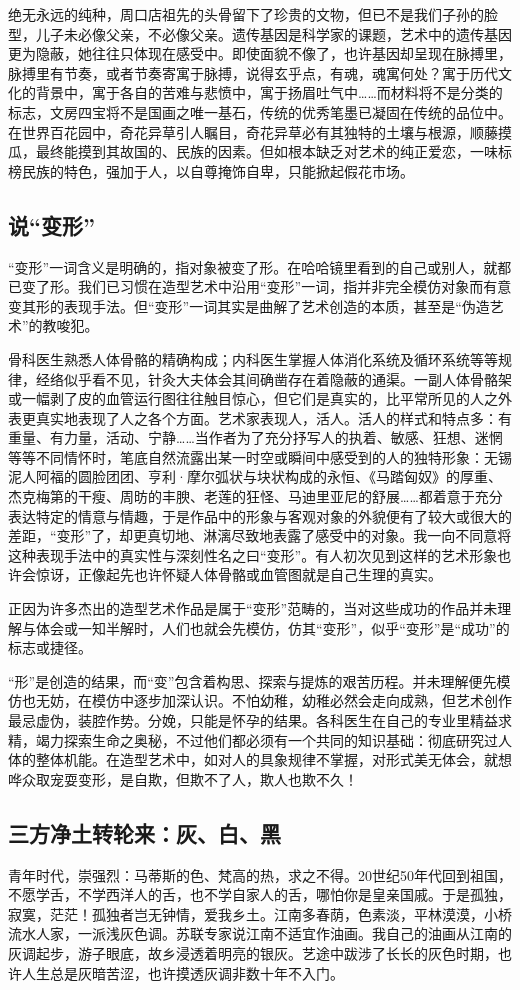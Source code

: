 \documentclass{article}
\begin{document}
绝无永远的纯种，周口店祖先的头骨留下了珍贵的文物，但已不是我们子孙的脸型，儿子未必像父亲，不必像父亲。遗传基因是科学家的课题，艺术中的遗传基因更为隐蔽，她往往只体现在感受中。即使面貌不像了，也许基因却呈现在脉搏里，脉搏里有节奏，或者节奏寄寓于脉搏，说得玄乎点，有魂，魂寓何处？寓于历代文化的背景中，寓于各自的苦难与悲愤中，寓于扬眉吐气中……而材料将不是分类的标志，文房四宝将不是国画之唯一基石，传统的优秀笔墨已凝固在传统的品位中。在世界百花园中，奇花异草引人瞩目，奇花异草必有其独特的土壤与根源，顺藤摸瓜，最终能摸到其故国的、民族的因素。但如根本缺乏对艺术的纯正爱恋，一味标榜民族的特色，强加于人，以自尊掩饰自卑，只能掀起假花市场。
\subsection{说“变形”}
“变形”一词含义是明确的，指对象被变了形。在哈哈镜里看到的自己或别人，就都已变了形。我们已习惯在造型艺术中沿用“变形”一词，指并非完全模仿对象而有意变其形的表现手法。但“变形”一词其实是曲解了艺术创造的本质，甚至是“伪造艺术”的教唆犯。

骨科医生熟悉人体骨骼的精确构成；内科医生掌握人体消化系统及循环系统等等规律，经络似乎看不见，针灸大夫体会其间确凿存在着隐蔽的通渠。一副人体骨骼架或一幅剥了皮的血管运行图往往触目惊心，但它们是真实的，比平常所见的人之外表更真实地表现了人之各个方面。艺术家表现人，活人。活人的样式和特点多：有重量、有力量，活动、宁静……当作者为了充分抒写人的执着、敏感、狂想、迷惘等等不同情怀时，笔底自然流露出某一时空或瞬间中感受到的人的独特形象：无锡泥人阿福的圆脸团团、亨利·摩尔弧状与块状构成的永恒、《马踏匈奴》的厚重、杰克梅第的干瘦、周昉的丰腴、老莲的狂怪、马迪里亚尼的舒展……都着意于充分表达特定的情意与情趣，于是作品中的形象与客观对象的外貌便有了较大或很大的差距，“变形”了，却更真切地、淋漓尽致地表露了感受中的对象。我一向不同意将这种表现手法中的真实性与深刻性名之曰“变形”。有人初次见到这样的艺术形象也许会惊讶，正像起先也许怀疑人体骨骼或血管图就是自己生理的真实。

正因为许多杰出的造型艺术作品是属于“变形”范畴的，当对这些成功的作品并未理解与体会或一知半解时，人们也就会先模仿，仿其“变形”，似乎“变形”是“成功”的标志或捷径。

“形”是创造的结果，而“变”包含着构思、探索与提炼的艰苦历程。并未理解便先模仿也无妨，在模仿中逐步加深认识。不怕幼稚，幼稚必然会走向成熟，但艺术创作最忌虚伪，装腔作势。分娩，只能是怀孕的结果。各科医生在自己的专业里精益求精，竭力探索生命之奥秘，不过他们都必须有一个共同的知识基础：彻底研究过人体的整体机能。在造型艺术中，如对人的具象规律不掌握，对形式美无体会，就想哗众取宠耍变形，是自欺，但欺不了人，欺人也欺不久！
\subsection{三方净土转轮来：灰、白、黑}
青年时代，崇强烈：马蒂斯的色、梵高的热，求之不得。20世纪50年代回到祖国，不愿学舌，不学西洋人的舌，也不学自家人的舌，哪怕你是皇亲国戚。于是孤独，寂寞，茫茫！孤独者岂无钟情，爱我乡土。江南多春荫，色素淡，平林漠漠，小桥流水人家，一派浅灰色调。苏联专家说江南不适宜作油画。我自己的油画从江南的灰调起步，游子眼底，故乡浸透着明亮的银灰。艺途中跋涉了长长的灰色时期，也许人生总是灰暗苦涩，也许摸透灰调非数十年不入门。
\end{document}
